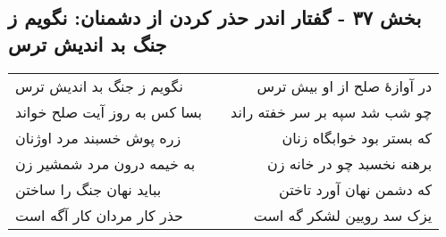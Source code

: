 \begin{center}
\section*{بخش ۳۷ - گفتار اندر حذر کردن از دشمنان: نگویم ز جنگ بد اندیش ترس}
\label{sec:037}
\begin{longtable}{l p{0.5cm} r}
نگویم ز جنگ بد اندیش ترس
&&
در آوازهٔ صلح از او بیش ترس
\\
بسا کس به روز آیت صلح خواند
&&
چو شب شد سپه بر سر خفته راند
\\
زره پوش خسبند مرد اوژنان
&&
که بستر بود خوابگاه زنان
\\
به خیمه درون مرد شمشیر زن
&&
برهنه نخسبد چو در خانه زن
\\
بباید نهان جنگ را ساختن
&&
که دشمن نهان آورد تاختن
\\
حذر کار مردان کار آگه است
&&
یزک سد رویین لشکر گه است
\\
\end{longtable}
\end{center}
